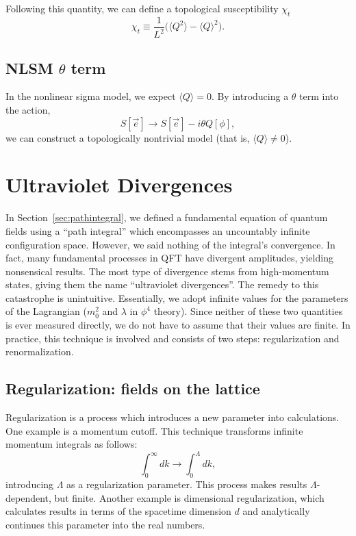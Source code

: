 \documentclass[12pt]{report}
\newcommand{\e}{\vec e}
\begin{document}
Following this quantity, we can define a topological susceptibility $\chi_t$
\begin{equation}
\chi_t \equiv \frac{1}{L^2} \Big( \langle Q^2 \rangle - \langle Q \rangle^2 \Big).
\end{equation}


\subsection{NLSM $\theta$ term}

In the nonlinear sigma model, we expect $\langle Q \rangle=0$. By introducing a $\theta$ term into the action,
\begin{equation}
    S[\e] \rightarrow S[\e] - i \theta Q[\phi],
\end{equation}
we can construct a topologically nontrivial model (that is, $\langle Q \rangle \neq 0$).

\section{Ultraviolet Divergences}

In Section~\ref{sec:pathintegral},  we defined a fundamental equation of quantum fields using a ``path integral'' which encompasses an uncountably infinite configuration space. However, we said nothing of the integral's convergence. In fact, many fundamental processes in QFT have divergent amplitudes, yielding nonsensical results. The most type of divergence stems from high-momentum states, giving them the name ``ultraviolet divergences''. The remedy to this catastrophe is unintuitive. Essentially, we adopt infinite values for the parameters of the Lagrangian ($m_0^2$ and $\lambda$ in $\phi^4$ theory). Since neither of these two quantities is ever measured directly, we do not have to assume that their values are finite. In practice, this technique is involved and consists of two steps: regularization and renormalization.

\subsection{Regularization: fields on the lattice}
Regularization is a process which introduces a new parameter into calculations. One example is a momentum cutoff. This technique transforms infinite momentum integrals as follows:  
\begin{equation*}
    \int_0^\infty dk \rightarrow \int_0^\Lambda dk,
\end{equation*}
introducing $\Lambda$ as a regularization parameter. This process makes results $\Lambda$-dependent, but finite. Another example is dimensional regularization, which calculates results in terms of the spacetime dimension $d$ and analytically continues this parameter into the real numbers. 
\end{document}
